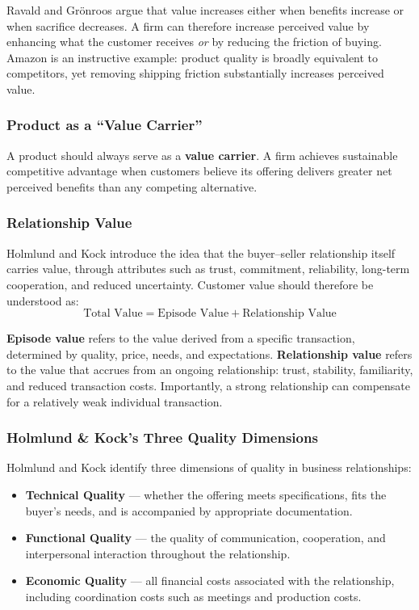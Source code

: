 Ravald and Grönroos argue that value increases either when benefits increase or when 
sacrifice decreases. A firm can therefore increase perceived value by enhancing what the 
customer receives \textit{or} by reducing the friction of buying. Amazon is an instructive 
example: product quality is broadly equivalent to competitors, yet removing shipping 
friction substantially increases perceived value.

\subsubsection*{Product as a ``Value Carrier''}

A product should always serve as a \textbf{value carrier}. A firm achieves sustainable 
competitive advantage when customers believe its offering delivers greater net perceived 
benefits than any competing alternative.

\subsubsection*{Relationship Value}

Holmlund and Kock introduce the idea that the buyer--seller relationship itself carries 
value, through attributes such as trust, commitment, reliability, long-term cooperation, 
and reduced uncertainty. Customer value should therefore be understood as:
\[
    \text{Total Value} = \text{Episode Value} + \text{Relationship Value}
\]

\textbf{Episode value} refers to the value derived from a specific transaction, determined 
by quality, price, needs, and expectations. \textbf{Relationship value} refers to the 
value that accrues from an ongoing relationship: trust, stability, familiarity, and 
reduced transaction costs. Importantly, a strong relationship can compensate for a 
relatively weak individual transaction.

\subsubsection*{Holmlund \& Kock's Three Quality Dimensions}

Holmlund and Kock identify three dimensions of quality in business relationships:

\begin{itemize}
    \item \textbf{Technical Quality} --- whether the offering meets specifications, fits 
    the buyer's needs, and is accompanied by appropriate documentation.
    \item \textbf{Functional Quality} --- the quality of communication, cooperation, and 
    interpersonal interaction throughout the relationship.
    \item \textbf{Economic Quality} --- all financial costs associated with the 
    relationship, including coordination costs such as meetings and production costs.
\end{itemize}

